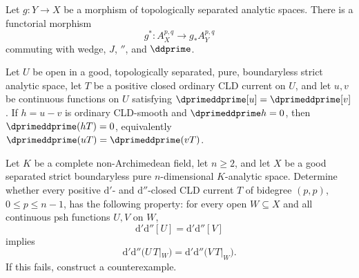 \begin{proposition}
\label{prop:cld-form-pullback}
Let $g:Y\to X$ be a morphism of topologically separated analytic spaces.
There is a functorial morphism
\[
                 g^*:A_X^{p,q}\longrightarrow g_*A_Y^{p,q}
\]
commuting with wedge, $J$, $\dprime$, and $\ddprime$.
\end{proposition}

\begin{corollary}
\label{cor:ch16-smooth-h}
Let $U$ be open in a good, topologically separated, pure, boundaryless
strict analytic space, let $T$ be a positive closed ordinary CLD current on
$U$, and let $u,v$ be continuous functions on $U$ satisfying
$\dprimeddprime[u]=\dprimeddprime[v]$.  If $h=u-v$ is ordinary CLD-smooth
and $\dprimeddprime h=0$, then
$\dprimeddprime(hT)=0$, equivalently
$\dprimeddprime(uT)=\dprimeddprime(vT)$.
\end{corollary}

\begin{problem}
\label{prob:frontier-cross-fan-upstairs}
Let $K$ be a complete non-Archimedean field, let $n\geq2$, and let $X$
be a good separated strict boundaryless pure $n$-dimensional
$K$-analytic space.  Determine whether every positive
$\mathrm d'$- and $\mathrm d''$-closed CLD current $T$ of bidegree
$(p,p)$, $0\leq p\leq n-1$, has the following property: for every open
$W\subseteq X$ and all continuous psh functions $U,V$ on $W$,
\[
                  \mathrm d'\mathrm d''[U]
                  =\mathrm d'\mathrm d''[V]
\]
implies
\[
 \mathrm d'\mathrm d''\bigl(U\,T|_W\bigr)
 =\mathrm d'\mathrm d''\bigl(V\,T|_W\bigr).
\]
If this fails, construct a counterexample.
\end{problem}
